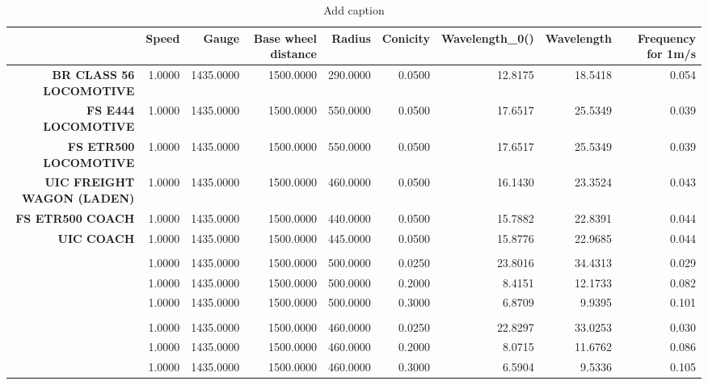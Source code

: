\begin{table}[htbp]
  \centering
  \caption{Add caption}
    \begin{tabular}{rrrrrrrrr}
    \toprule
    \textbf{} & \textbf{Speed} & \textbf{Gauge} & \textbf{Base wheel distance} & \textbf{Radius} & \textbf{Conicity} & \textbf{Wavelength\_0()} & \textbf{Wavelength} & \textbf{Frequency for 1m/s} \\
    \midrule
    \textbf{BR CLASS 56 LOCOMOTIVE} & 1.0000 & 1435.0000 & 1500.0000 & 290.0000 & 0.0500 & 12.8175 & 18.5418 & 0.054 \\
    \textbf{FS E444 LOCOMOTIVE} & 1.0000 & 1435.0000 & 1500.0000 & 550.0000 & 0.0500 & 17.6517 & 25.5349 & 0.039 \\
    \textbf{FS ETR500 LOCOMOTIVE} & 1.0000 & 1435.0000 & 1500.0000 & 550.0000 & 0.0500 & 17.6517 & 25.5349 & 0.039 \\
    \textbf{UIC FREIGHT WAGON (LADEN)} & 1.0000 & 1435.0000 & 1500.0000 & 460.0000 & 0.0500 & 16.1430 & 23.3524 & 0.043 \\
    \textbf{FS ETR500 COACH} & 1.0000 & 1435.0000 & 1500.0000 & 440.0000 & 0.0500 & 15.7882 & 22.8391 & 0.044 \\
    \textbf{UIC COACH} & 1.0000 & 1435.0000 & 1500.0000 & 445.0000 & 0.0500 & 15.8776 & 22.9685 & 0.044 \\
    \textbf{} &       &       &       &       &       &       &       &  \\
    \textbf{} & 1.0000 & 1435.0000 & 1500.0000 & 500.0000 & 0.0250 & 23.8016 & 34.4313 & 0.029 \\
    \textbf{} & 1.0000 & 1435.0000 & 1500.0000 & 500.0000 & 0.2000 & 8.4151 & 12.1733 & 0.082 \\
    \textbf{} & 1.0000 & 1435.0000 & 1500.0000 & 500.0000 & 0.3000 & 6.8709 & 9.9395 & 0.101 \\
    \textbf{} &       &       &       &       &       &       &       &  \\
    \textbf{} & 1.0000 & 1435.0000 & 1500.0000 & 460.0000 & 0.0250 & 22.8297 & 33.0253 & 0.030 \\
    \textbf{} & 1.0000 & 1435.0000 & 1500.0000 & 460.0000 & 0.2000 & 8.0715 & 11.6762 & 0.086 \\
    \textbf{} & 1.0000 & 1435.0000 & 1500.0000 & 460.0000 & 0.3000 & 6.5904 & 9.5336 & 0.105 \\
    \bottomrule
    \end{tabular}%
  \label{tab:addlabel}%
\end{table}%


